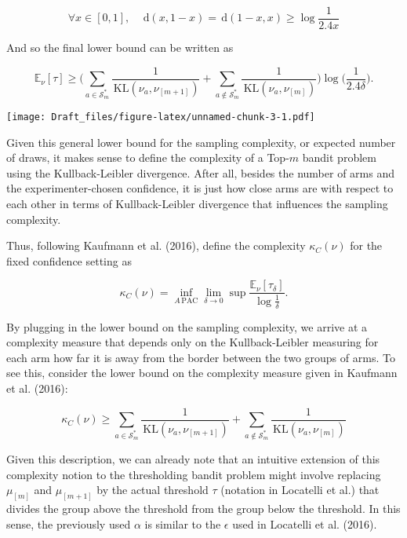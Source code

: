 \documentclass[12pt,]{article}
\newcommand{\KL}{\,\text{KL}}
\newcommand{\der}{\,\text{d}}
\begin{document}
\begin{equation}\label{bre_approx}
\forall x \in [0,1], \quad \der(x,1-x) = \der(1-x,x) \geq \log \frac{1}{2.4x}
\end{equation}

And so the final lower bound can be written as

\begin{equation*}
\mathbb{E}_{\nu}[\tau] \geq \Big( \sum_{a \in \mathcal{S}_m^*} \frac{1}{\KL(\nu_a, \nu_{[m+1]})} + \sum_{a \notin \mathcal{S}_m^*} \frac{1}{\KL(\nu_a, \nu_{[m]})} \Big) \log \big(\frac{1}{2.4\delta} \big).
\end{equation*}

\texttt{[image: Draft\_files/figure-latex/unnamed-chunk-3-1.pdf]}

Given this general lower bound for the sampling complexity, or expected
number of draws, it makes sense to define the complexity of a Top-\(m\)
bandit problem using the Kullback-Leibler divergence. After all, besides
the number of arms and the experimenter-chosen confidence, it is just
how close arms are with respect to each other in terms of
Kullback-Leibler divergence that influences the sampling complexity.

Thus, following Kaufmann et al. (2016), define the complexity
\(\kappa_C(\nu)\) for the fixed confidence setting as

\begin{equation}
\kappa_C(\nu) = \inf_{A \, \text{PAC}} \lim_{\delta \to 0} \sup \frac{\mathbb{E}_{\nu}[\tau_{\delta}]}{\log \frac{1}{\delta}}.
\end{equation}

By plugging in the lower bound on the sampling complexity, we arrive at
a complexity measure that depends only on the Kullback-Leibler measuring
for each arm how far it is away from the border between the two groups
of arms. To see this, consider the lower bound on the complexity measure
given in Kaufmann et al. (2016):

\begin{equation*}
\kappa_C(\nu) \geq \sum_{a \in \mathcal{S}_m^*} \frac{1}{\KL(\nu_a, \nu_{[m+1]})} + \sum_{a \notin \mathcal{S}_m^*} \frac{1}{\KL(\nu_a, \nu_{[m]})}
\end{equation*}

Given this description, we can already note that an intuitive extension
of this complexity notion to the thresholding bandit problem might
involve replacing \(\mu_{[m]}\) and \(\mu_{[m+1]}\) by the actual
threshold \(\tau\) (notation in Locatelli et al.) that divides the group
above the threshold from the group below the threshold. In this sense,
the previously used \(\alpha\) is similar to the \(\epsilon\) used in
Locatelli et al. (2016).
\end{document}
